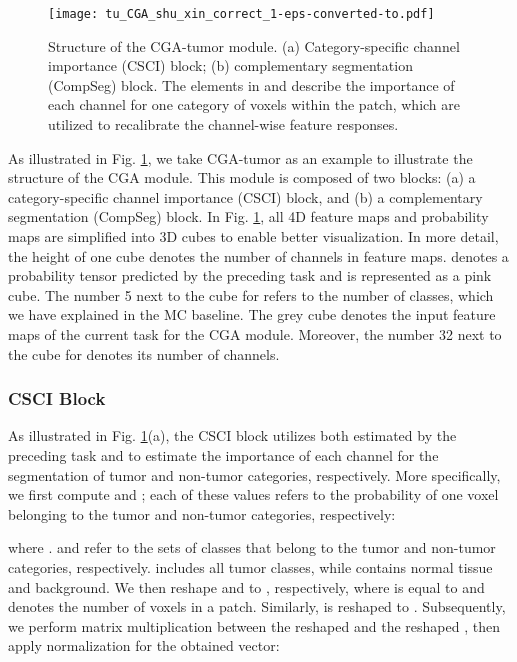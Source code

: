 \documentclass[journal,twoside]{IEEEtran}
\begin{document}
\begin{figure}
	\centering 
	\texttt{[image: tu\_CGA\_shu\_xin\_correct\_1-eps-converted-to.pdf]} 	
	\caption{Structure of the CGA-tumor module. (a) Category-specific channel importance (CSCI) block; (b) complementary segmentation (CompSeg) block. The elements in	 and  describe the importance of each channel for one category of voxels within the patch, which are utilized to recalibrate the channel-wise feature responses.
	}
	\label{Fig.4}	
\end{figure}

As illustrated in Fig. \ref{Fig.4}, we take CGA-tumor as an example to illustrate the structure of the CGA module. This module is composed of two blocks: (a) a category-specific channel importance (CSCI) block, and (b) a complementary segmentation (CompSeg) block. In Fig. \ref{Fig.4}, all 4D feature maps and probability maps are simplified into 3D cubes to enable better visualization. In more detail, the height of one cube denotes the number of channels in feature maps.  denotes a probability tensor predicted by the preceding task and is represented as a pink cube. The number 5 next to the cube for  refers to the number of classes, which we have explained in the MC baseline. The grey cube  denotes the input feature maps of the current task for the CGA module. Moreover, the number 32 next to the cube for  denotes its number of channels.



\subsubsection{CSCI Block}
As illustrated in Fig. \ref{Fig.4}(a), the CSCI block utilizes both  estimated by the preceding task and  to estimate the importance of each channel for the segmentation of tumor and non-tumor categories, respectively. More specifically, we first compute  and ; each of these values refers to the probability of one voxel belonging to the tumor and non-tumor categories, respectively: 
  

where .  and  refer to the sets of classes that belong to the tumor and non-tumor categories, respectively.  includes all tumor classes, while  contains normal tissue and background.
We then reshape  and  to , respectively, where  is equal to  and denotes the number of voxels in a patch. Similarly,  is reshaped to . Subsequently, we perform matrix multiplication between the reshaped  and the reshaped , then apply  normalization for the obtained vector:   
\end{document}
